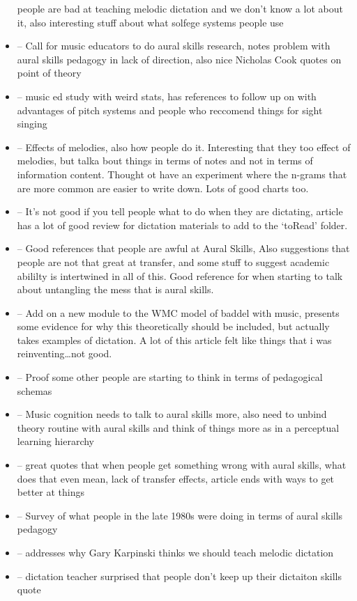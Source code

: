 \documentclass[]{book}
\theoremstyle{definition}
\theoremstyle{definition}
\theoremstyle{definition}
\theoremstyle{remark}
\begin{document}
\begin{itemize}
  people are bad at teaching melodic dictation and we don't know a lot
  about it, also interesting stuff about what solfege systems people use
\item
  \citep{davidbutlerWhyGulfMusic1997a} -- Call for music educators to do
  aural skills research, notes problem with aural skills pedagogy in
  lack of direction, also nice Nicholas Cook quotes on point of theory
\item
  \citep{furbyEffectsPeerTutoring2016} -- music ed study with weird
  stats, has references to follow up on with advantages of pitch systems
  and people who reccomend things for sight singing
\item
  \citep{pembrookInterferenceTranscriptionProcess1986} -- Effects of
  melodies, also how people do it. Interesting that they too effect of
  melodies, but talka bout things in terms of notes and not in terms of
  information content. Thought ot have an experiment where the n-grams
  that are more common are easier to write down. Lots of good charts
  too.
\item
  \citep{paneyEffectDirectingAttention2016} -- It's not good if you tell
  people what to do when they are dictating, article has a lot of good
  review for dictation materials to add to the `toRead' folder.
\item
  \citep{fournierCognitiveStrategiesSightsinging2017a} -- Good
  references that people are awful at Aural Skills, Also suggestions
  that people are not that great at transfer, and some stuff to suggest
  academic abililty is intertwined in all of this. Good reference for
  when starting to talk about untangling the mess that is aural skills.
\item
  \citep[ 1995]{berzWorkingMemoryMusic} -- Add on a new module to the
  WMC model of baddel with music, presents some evidence for why this
  theoretically should be included, but actually takes examples of
  dictation. A lot of this article felt like things that i was
  reinventing\ldots{}not good.
\item
  \citep{atkinsonSomeThoughtsOnTrying} -- Proof some other people are
  starting to think in terms of pedagogical schemas
\item
  \citep{klonoskiPerceptualLearningHierarchy2000} -- Music cognition
  needs to talk to aural skills more, also need to unbind theory routine
  with aural skills and think of things more as in a perceptual learning
  hierarchy
\item
  \citep{klonoskiImprovingDictationAuralSkills2006} -- great quotes that
  when people get something wrong with aural skills, what does that even
  mean, lack of transfer effects, article ends with ways to get better
  at things
\item
  \citep{pembrookSendHelpAural1990} -- Survey of what people in the late
  1980s were doing in terms of aural skills pedagogy
\item
  \citep{karpinskiModelMelodicPerception1990} -- addresses why Gary
  Karpinski thinks we should teach melodic dictation
\item
  \citep{potterIdentifyingSucessfulDictation1990} -- dictation teacher
  surprised that people don't keep up their dictaiton skills quote
\end{itemize}
\end{document}
